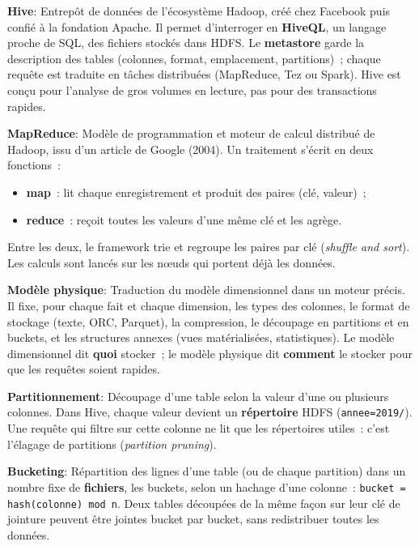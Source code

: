 \separateur

\noindent \textbf{Hive}:
\noindent Entrepôt de données de l'écosystème Hadoop, créé chez Facebook puis confié à la fondation Apache. Il permet d'interroger en \textbf{HiveQL}, un langage proche de SQL, des fichiers stockés dans HDFS. Le \textbf{metastore} garde la description des tables (colonnes, format, emplacement, partitions)~; chaque requête est traduite en tâches distribuées (MapReduce, Tez ou Spark). Hive est conçu pour l'analyse de gros volumes en lecture, pas pour des transactions rapides.

\separateur

\noindent \textbf{MapReduce}:
\noindent Modèle de programmation et moteur de calcul distribué de Hadoop, issu d'un article de Google (2004). Un traitement s'écrit en deux fonctions~:
\begin{itemize}
	\item \textbf{map}~: lit chaque enregistrement et produit des paires (clé, valeur)~;
	\item \textbf{reduce}~: reçoit toutes les valeurs d'une même clé et les agrège.
\end{itemize}
Entre les deux, le framework trie et regroupe les paires par clé (\textit{shuffle and sort}). Les calculs sont lancés sur les n\oe uds qui portent déjà les données.

\separateur

\noindent \textbf{Modèle physique}:
\noindent Traduction du modèle dimensionnel dans un moteur précis. Il fixe, pour chaque fait et chaque dimension, les types des colonnes, le format de stockage (texte, ORC, Parquet), la compression, le découpage en partitions et en buckets, et les structures annexes (vues matérialisées, statistiques). Le modèle dimensionnel dit \textbf{quoi} stocker~; le modèle physique dit \textbf{comment} le stocker pour que les requêtes soient rapides.

\separateur

\noindent \textbf{Partitionnement}:
\noindent Découpage d'une table selon la valeur d'une ou plusieurs colonnes. Dans Hive, chaque valeur devient un \textbf{répertoire} HDFS (\texttt{annee=2019/}). Une requête qui filtre sur cette colonne ne lit que les répertoires utiles~: c'est l'élagage de partitions (\textit{partition pruning}).

\separateur

\noindent \textbf{Bucketing}:
\noindent Répartition des lignes d'une table (ou de chaque partition) dans un nombre fixe de \textbf{fichiers}, les buckets, selon un hachage d'une colonne~: \texttt{bucket = hash(colonne) mod n}. Deux tables découpées de la même façon sur leur clé de jointure peuvent être jointes bucket par bucket, sans redistribuer toutes les données.


